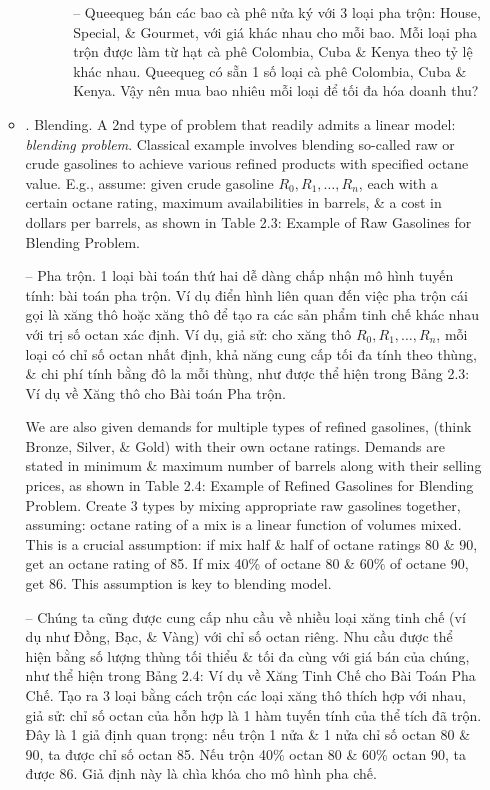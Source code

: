 \documentclass{article}
\begin{document}
\begin{itemize}
\begin{itemize}
\begin{itemize}
\begin{enumerate}
                -- Queequeg bán các bao cà phê nửa ký với 3 loại pha trộn: House, Special, \& Gourmet, với giá khác nhau cho mỗi bao. Mỗi loại pha trộn được làm từ hạt cà phê Colombia, Cuba \& Kenya theo tỷ lệ khác nhau. Queequeg có sẵn 1 số loại cà phê Colombia, Cuba \& Kenya. Vậy nên mua bao nhiêu mỗi loại để tối đa hóa doanh thu?
            \end{enumerate}
        \end{itemize}
        \item {. Blending.} A 2nd type of problem that readily admits a linear model: {\it blending problem}. Classical example involves blending so-called raw or crude gasolines to achieve various refined products with specified octane value. E.g., assume: given crude gasoline $R_0,R_1,\ldots,R_n$, each with a certain octane rating, maximum availabilities in barrels, \& a cost in dollars per barrels, as shown in {\sf Table 2.3: Example of Raw Gasolines for Blending Problem}.

        -- {\sf Pha trộn.} 1 loại bài toán thứ hai dễ dàng chấp nhận mô hình tuyến tính: {\sf bài toán pha trộn}. Ví dụ điển hình liên quan đến việc pha trộn cái gọi là xăng thô hoặc xăng thô để tạo ra các sản phẩm tinh chế khác nhau với trị số octan xác định. Ví dụ, giả sử: cho xăng thô $R_0,R_1,\ldots,R_n$, mỗi loại có chỉ số octan nhất định, khả năng cung cấp tối đa tính theo thùng, \& chi phí tính bằng đô la mỗi thùng, như được thể hiện trong {\sf Bảng 2.3: Ví dụ về Xăng thô cho Bài toán Pha trộn}.

        We are also given demands for multiple types of refined gasolines, (think Bronze, Silver, \& Gold) with their own octane ratings. Demands are stated in minimum \& maximum number of barrels along with their selling prices, as shown in {\sf Table 2.4: Example of Refined Gasolines for Blending Problem}. Create 3 types by mixing appropriate raw gasolines together, assuming: octane rating of a mix is a linear function of volumes mixed. This is a crucial assumption: if mix half \& half of octane ratings 80 \& 90, get an octane rating of 85. If mix 40\% of octane 80 \& 60\% of octane 90, get 86. This assumption is key to blending model.

        -- Chúng ta cũng được cung cấp nhu cầu về nhiều loại xăng tinh chế (ví dụ như Đồng, Bạc, \& Vàng) với chỉ số octan riêng. Nhu cầu được thể hiện bằng số lượng thùng tối thiểu \& tối đa cùng với giá bán của chúng, như thể hiện trong {\sf Bảng 2.4: Ví dụ về Xăng Tinh Chế cho Bài Toán Pha Chế}. Tạo ra 3 loại bằng cách trộn các loại xăng thô thích hợp với nhau, giả sử: chỉ số octan của hỗn hợp là 1 hàm tuyến tính của thể tích đã trộn. Đây là 1 giả định quan trọng: nếu trộn 1 nửa \& 1 nửa chỉ số octan 80 \& 90, ta được chỉ số octan 85. Nếu trộn 40\% octan 80 \& 60\% octan 90, ta được 86. Giả định này là chìa khóa cho mô hình pha chế.


\end{itemize}
\end{itemize}
\end{document}
